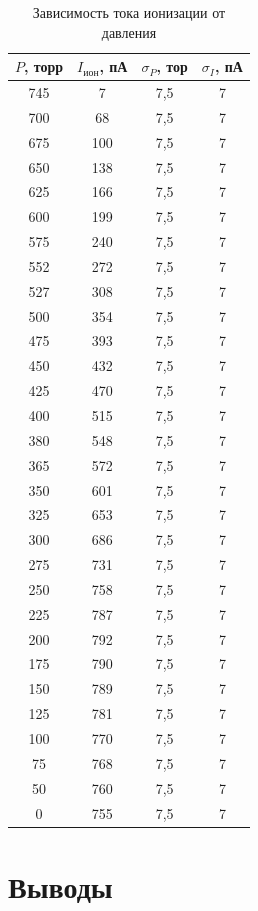 \documentclass[a4paper]{article}
\begin{document}
\begin{table}[h]
\centering
\caption{Зависимость тока ионизации от давления}
\begin{tabular}{|c|c|c|c|}
\hline
\textbf{$P$, торр} & \textbf{$I_{\text{ион}}$, пА} & \textbf{$\sigma_P$, тор} & \textbf{$\sigma_I$, пА} \\
\hline
745  & 7   & 7{,}5 & 7 \\
700  & 68  & 7{,}5 & 7 \\
675  & 100 & 7{,}5 & 7 \\
650  & 138 & 7{,}5 & 7 \\
625  & 166 & 7{,}5 & 7 \\
600  & 199 & 7{,}5 & 7 \\
575  & 240 & 7{,}5 & 7 \\
552  & 272 & 7{,}5 & 7 \\
527  & 308 & 7{,}5 & 7 \\
500  & 354 & 7{,}5 & 7 \\
475  & 393 & 7{,}5 & 7 \\
450  & 432 & 7{,}5 & 7 \\
425  & 470 & 7{,}5 & 7 \\
400  & 515 & 7{,}5 & 7 \\
380  & 548 & 7{,}5 & 7 \\
365  & 572 & 7{,}5 & 7 \\
350  & 601 & 7{,}5 & 7 \\
325  & 653 & 7{,}5 & 7 \\
300  & 686 & 7{,}5 & 7 \\
275  & 731 & 7{,}5 & 7 \\
250  & 758 & 7{,}5 & 7 \\
225  & 787 & 7{,}5 & 7 \\
200  & 792 & 7{,}5 & 7 \\
175  & 790 & 7{,}5 & 7 \\
150  & 789 & 7{,}5 & 7 \\
125  & 781 & 7{,}5 & 7 \\
100  & 770 & 7{,}5 & 7 \\
75   & 768 & 7{,}5 & 7 \\
50   & 760 & 7{,}5 & 7 \\
0    & 755 & 7{,}5 & 7 \\
\hline
\end{tabular}
\end{table}


\section{Выводы}
\end{document}
